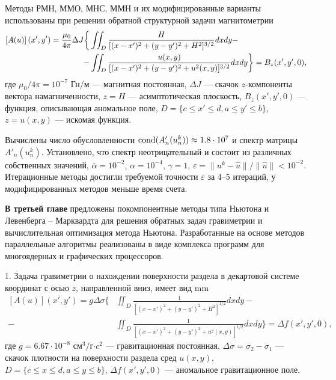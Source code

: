 \documentclass[%
autoref,     %
href,        %
colorlinks,  %
]{disser}
\begin{document}
Методы РМН, ММО, МНС, ММН и их модифицированные варианты использованы при решении обратной структурной задачи магнитометрии
\begin{equation*}\begin{aligned}
\left[A(u)\right](x',y')=\frac{\mu_0}{4\pi}\Delta J  \bigg\{&\iint_{D} \frac{H}{[(x-x')^2+(y-y')^2+H^2]^{3/2}}dxdy - \notag\\
- &\iint_{D} \frac{u(x,y)}{[(x-x')^2+(y-y')^2+u^2(x,y)]^{3/2}}dxdy \bigg\}= B_z(x',y',0),
\end{aligned} \end{equation*}
где $\mu_0/{4\pi}=10^{-7}$ Гн/м --- магнитная постоянная, $\Delta J$ --- скачок $z$-компоненты вектора намагниченности, $z=H$ --- асимптотическая плоскость, $ B_z(x',y',0)$ --- функция, описывающая  аномальное поле, $D=\{c\leqslant x' \leqslant d, a\leqslant y' \leqslant b\}$, $z=u(x,y)$ --- искомая функция.

Вычислены число обусловленности $\textnormal{cond}(A'_n(u_n^k))\approx 1.8\cdot 10^7$ и спектр матрицы $A'_n(u_n^k)$. Установлено, что спектр неотрицательный и состоит из различных собственных значений, $\bar\alpha=10^{-2}$, $\alpha = 10^{-4}$, $\gamma=1$, $\varepsilon =\|u^k-\hat{u}\|/\|\hat{u}\| < 10^{-2}$. Итерационные методы достигли требуемой точности $\varepsilon$ за 4--5 итераций, у модифицированных методов меньше время счета.

\textbf{В третьей главе} предложены покомпонентные методы типа Ньютона и Левенберга -- Марквардта для решения обратных задач гравиметрии и вычислительная оптимизация метода Ньютона. Разработанные на основе методов параллельные алгоритмы реализованы в виде комплекса программ для многоядерных и графических процессоров.

1. Задача гравиметрии о нахождении поверхности раздела в декартовой системе координат с осью $z$, направленной вниз, имеет вид
 mm
\begin{equation}\label{equ_grav_2l}
\begin{aligned}
\left[A(u)\right](x',y')=g\Delta\sigma \bigg\{ &\iint_{D} \frac{1}{[(x-x')^2+(y-y')^2+H^2]^{1/2}}dxdy - \\
- &\iint_{D} \frac{1}{[(x-x')^2+(y-y')^2+u^2(x,y)]^{1/2}}dxdy\bigg\}=\Delta f(x',y',0),
\end{aligned} 
\end{equation}
	где $g=6.67\cdot10^{-8}$ см$^3/$г$\cdot c^2$ --- гравитационная постоянная, $\Delta\sigma=\sigma_2-\sigma_1$ --- скачок плотности на поверхности раздела сред $u(x,y)$, $D=\{c\leqslant x \leqslant d, a\leqslant y \leqslant b\}$, $\Delta f(x',y',0)$ --- аномальное гравитационное поле.%
	
\end{document}
